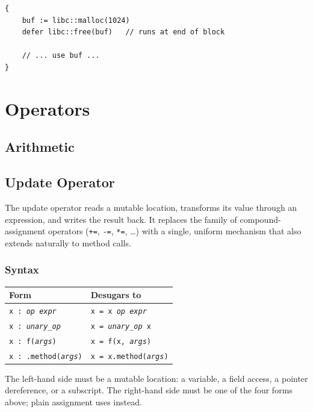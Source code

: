 \begin{lstlisting}[style=zinc, caption={defer}]
{
    buf := libc::malloc(1024)
    defer libc::free(buf)   // runs at end of block

    // ... use buf ...
}
\end{lstlisting}

\section{Operators}

\subsection{Arithmetic}

\subsection{Update Operator}

The update operator \zn{:} reads a mutable location, transforms its value
through an expression, and writes the result back. It replaces the family of
compound-assignment operators (\texttt{+=}, \texttt{-=}, \texttt{*=}, \ldots)
with a single, uniform mechanism that also extends naturally to method calls.

\subsubsection*{Syntax}

\begin{center}
\begin{tabular}{ll}
\toprule
Form & Desugars to \\
\midrule
\texttt{x : \emph{op} \emph{expr}} & \texttt{x = x \emph{op} \emph{expr}} \\
\texttt{x : \emph{unary\_op}}      & \texttt{x = \emph{unary\_op} x}      \\
\texttt{x : f(\emph{args})}        & \texttt{x = f(x, \emph{args})}       \\
\texttt{x : .method(\emph{args})}  & \texttt{x = x.method(\emph{args})}   \\
\bottomrule
\end{tabular}
\end{center}

The left-hand side must be a mutable location: a variable, a field access, a
pointer dereference, or a subscript. The right-hand side must be one of the
four forms above; plain assignment uses \zn{=} instead.


